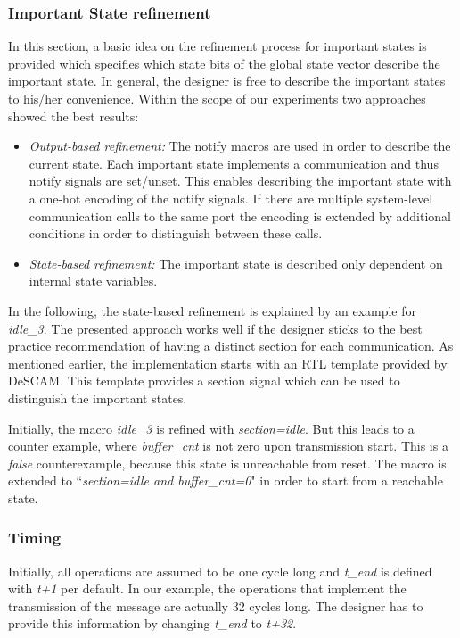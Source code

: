 \subsubsection{Important State refinement} 

In this section, a basic idea on the refinement process for important states is provided which specifies which state bits of the global state vector describe the important state. 
In general, the designer is free to describe the important states to his/her convenience. 
Within the scope of our experiments two approaches showed the best results:

\begin{itemize}
\item\textit{Output-based refinement:} 
The notify macros are used in order to describe the current state. 
Each important state implements a communication and thus notify signals are set/unset. 
This enables describing the important state with a one-hot encoding of the notify signals. 
If there are multiple system-level communication calls to the same port the encoding is extended by additional conditions in order to distinguish between these calls. 
\item\textit{State-based refinement:}
The important state is described only dependent on internal state variables. 
\end{itemize}

In the following, the state-based refinement is explained by an example for \textit{idle\_3}.
The presented approach works well if the designer sticks to the best practice recommendation of having a distinct section for each communication.
As mentioned earlier, the implementation starts with an RTL template provided by DeSCAM. 
This template provides a section signal which can be used to distinguish the important states. 

Initially, the macro \textit{idle\_3} is refined with \textit{section=idle}. 
But this leads to a counter example, where \textit{buffer\_cnt} is not zero upon transmission start. 
This is a \textit{false} counterexample, because this state is unreachable from reset. 
The macro is extended to ``\textit{section=idle and buffer\_cnt=0}" in order to start from a reachable state. 

\subsubsection{Timing}
Initially, all operations are assumed to be one cycle long and \textit{t\_end} is defined with \textit{t+1} per default.
In our example, the operations that implement the transmission of the message are actually 32 cycles long. 
The designer has to provide this information by changing \textit{t\_end} to \textit{t+32}. 